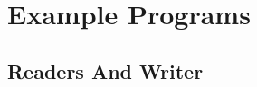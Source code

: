 \documentclass[openright,twoside]{report}
\begin{document}
\chapter{Example Programs}
\label{c:ExamplePrograms}


% 
% 
% 


\section{Readers And Writer}
\label{s:ReadersAndWriter}
\end{document}
